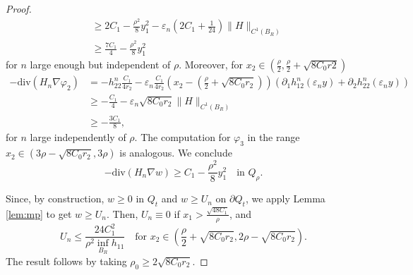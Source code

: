 \documentclass[10pt,a4paper]{article}
\newcommand{\divg}{\mathrm{div}}
\newcommand{\faskip}{\hspace{8pt}}
\numberwithin{equation}{section}
\begin{document}
\begin{proof}
\begin{align*}
				     &\geq 2C_1 - \frac{\rho^2}{8}y_1^2 - \varepsilon_n\left(2C_1 + \frac{1}{24}\right)\|H\|_{C^1(B_R)}\\
				     &\geq \frac{7C_1}{4} - \frac{\rho^2}{8}y_1^2
\end{align*}
for $ n $ large enough but independent of $ \rho $. Moreover, for $ x_2 \in \left( \frac{\rho}{2}, \frac{\rho}{2} + \sqrt{8C_0r2} \right)  $ 
\begin{align*}
	-\divg(H_n \nabla \varphi_2) & = -h_{22}^n \frac{C_1}{4r_2} - \varepsilon_n	\frac{C_1}{4r_2} \left( x_2 -\left( \frac{\rho}{2} + \sqrt{8C_0r_2} \right) \right) \left(\partial_1 h_12^n(\varepsilon_n y) + \partial_2 h_22^n(\varepsilon_n y) \right) \\
				     & \geq -\frac{C_1}{4} - \varepsilon_n\sqrt{8C_0r_2} \|H\|_{C^1(B_R)}\\
				     & \geq -\frac{3C_1}{8},
\end{align*}
for $ n $ large independently of $ \rho $. The computation for $ \varphi_3 $ in the range $ x_2 \in (3\rho - \sqrt{8C_0r_2}, 3\rho) $ is analogous. We conclude
\[
	-\divg(H_n \nabla w) \geq C_1 - \frac{\rho^2}{8}y_1^2 \faskip \text{ in }Q_{\rho}.
\]

Since, by construction, $ w\geq 0  $ in $ Q_t $ and $ w \geq U_n $ on $ \partial Q_t $, we apply Lemma \ref{lem:mp} to get $ w \geq U_n $. Then, $ U_n \equiv 0 $ if $ x_1 > \frac{\sqrt{48C_1}}{\rho} $, and
\[ U_n \leq \frac{24 C_1^2}{\rho^2 \inf_{B_R}h_{11}} \faskip \text{ for } x_2 \in \left( \frac{\rho}{2} + \sqrt{8C_0r_2}, 2\rho - \sqrt{8C_0r_2}  \right). \]
The result follows by taking $ \rho_0 \geq 2 \sqrt{8C_0r_2} $. 
\end{proof}
\end{document}
